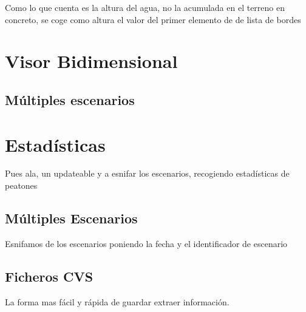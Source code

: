 Como lo que cuenta es la altura del agua, no la acumulada en el terreno en
concreto, se coge como altura el valor del primer elemento de de lista de bordes
\section*{Visor Bidimensional}
\subsection*{Múltiples escenarios}
\section*{Estadísticas}
Pues ala, un updateable y a esnifar los escenarios, recogiendo estadísticas de
peatones
\subsection*{Múltiples Escenarios}
Esnifamos de los escenarios poniendo la fecha y el identificador de escenario
\subsection*{Ficheros CVS}
La forma mas fácil y rápida de guardar extraer información.

